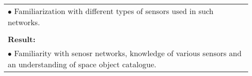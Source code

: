 \begin{table}[!h]
\begin{center}
\begin{tabular}{|p{35mm}||p{55mm}|p{50mm}||p{40mm}|}
      \multicolumn{4}{|p{150mm}|}{$\bullet$ Familiarization with different types of sensors used in such networks.} \\
      \multicolumn{4}{|p{150mm}|}{}                                                                                                                                                                           \\
      \multicolumn{4}{|p{150mm}|}{\textbf{Result:}}                                                                                                                                                       \\
      \multicolumn{4}{|p{150mm}|}{$\bullet$ Familiarity with senosr networks, knowledge of various sensors and an understanding of space object catalogue.}                                                                                                                          \\
      \hline
    \end{tabular}
  \end{center}
\end{table}

\clearpage

